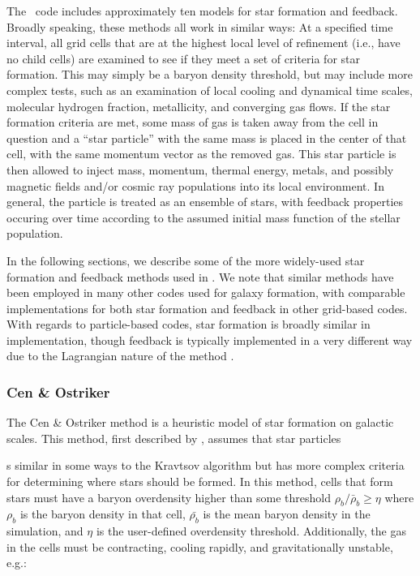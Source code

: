 The \enzo\ code includes approximately ten models for star formation
and feedback.  Broadly speaking, these methods all work in similar
ways: At a specified time interval, all grid cells that are at the
highest local level of refinement (i.e., have no child cells) are
examined to see if they meet a set of criteria for star formation.
This may simply be a baryon density threshold, but may include more
complex tests, such as an examination of local cooling and dynamical
time scales, molecular hydrogen fraction, metallicity, and converging
gas flows.  If the star formation criteria are met, some mass of gas
is taken away from the cell in question and a ``star particle'' with the
same mass is placed in the center of that cell, with the same momentum
vector as the removed gas.  This star particle is then allowed to
inject mass, momentum, thermal energy, metals, and possibly magnetic
fields and/or cosmic ray populations into its local environment.  In
general, the particle is treated as an ensemble of stars, with
feedback properties occuring over time according to the assumed
initial mass function of the stellar population.

In the following sections, we describe some of the more widely-used star formation
and feedback methods used in \enzo.  We note that similar methods have
been employed in many other codes used for galaxy formation, with
comparable implementations for both star formation and feedback in
other grid-based codes.  With regards to particle-based codes, star
formation is broadly similar in implementation, though feedback is
typically implemented in a very different way due to the Lagrangian
nature of the method \citep[see, e.g.,][]{sh03a,sh03b,hs03}.

\subsubsection{Cen \& Ostriker}
\label{sec:starform_cen}

The Cen \& Ostriker method is a heuristic model of star formation
on galactic scales.  This method, first described by
\citet{CO1992}, assumes that star particles 

s similar in some ways to the Kravtsov algorithm
but has more complex criteria for determining where stars should
be formed.  In this method, cells that form stars must have a 
baryon overdensity higher than some threshold 
$\rho_b/\bar{\rho}_b \geq \eta$ 
where $\rho_b$ is the baryon density in that cell, 
$\bar{\rho_b}$ is the mean baryon density in the simulation,
and $\eta$ is the user-defined overdensity threshold.
Additionally, the gas in the cells must be contracting, 
cooling rapidly, and gravitationally unstable, e.g.:

